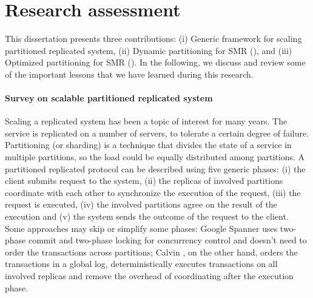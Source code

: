 \section{Research assessment}

This dissertation presents three contributions: (i) Generic framework for
scaling partitioned replicated system, (ii) Dynamic partitioning for SMR
(\dssmr), and (iii) Optimized partitioning for SMR (\dynastar). In the following,
we discuss and review some of the important lessons that we have learned during
this research.

\paragraph{Survey on scalable partitioned replicated system}
Scaling a replicated system has been a topic of interest for many years. The
service is replicated on a number of servers, to tolerate a certain degree of
failure. Partitioning (or sharding) is a technique that divides the state of a
service in multiple partitions, so the load could be  equally distributed among
partitions. A partitioned replicated protocol can be described using five
generic phases: (i) the client submits request to the system, (ii) the replicas
of involved partitions coordinate with each other to synchronize the execution
of the request, (iii) the request is executed, (iv) the involved partitions
agree on the result of the execution and (v) the system sends the outcome of the
request to the client. Some approaches may skip or simplify some phases: Google
Spanner \cite{corbett2013spanner} uses two-phase commit and two-phase locking
for concurrency control and doesn't need to order the transactions across
partitions; Calvin \cite{calvin}, on the other hand, orders the transactions in
a global log, deterministically executes transactions on all involved replicas
and remove the overhead of coordinating after the execution phase.

